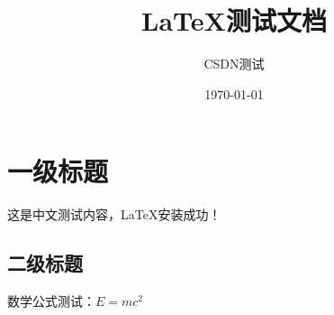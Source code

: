 \documentclass{article}
\title{LaTeX测试文档}
\author{CSDN测试}
\date{\today}
\begin{document}
    \maketitle

    \section{一级标题}
    这是中文测试内容，LaTeX安装成功！

    \subsection{二级标题}
    数学公式测试：$E=mc^2$
\end{document}
